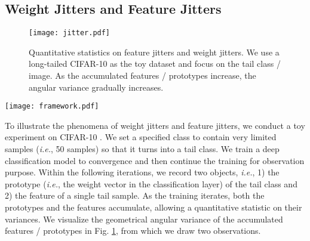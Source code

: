 \documentclass[final]{cvpr}
\def\ie{\textit{i.e.}}
\begin{document}
\subsection{Weight Jitters and Feature Jitters}\label{sec:jitter}
\begin{figure}[t]
	\centering
	\texttt{[image: jitter.pdf]} 
\caption{Quantitative statistics on feature jitters and weight jitters. We use a long-tailed CIFAR-10 \cite{cifar1} as the toy dataset and focus on the tail class / image. As the accumulated features / prototypes increase, the angular variance gradually increases.}
\vspace{-0.5cm}
\label{fig:div}
\end{figure}

\begin{figure*}[t]
	\centering
	\texttt{[image: framework.pdf]} 
	\caption{MBJ for deep image classification collects historical features into memory with higher concentration on tail classes. MBJ randomly samples the raw images and transforms them into a batch of features with a convolutional neural network. Given current batch features, MBJ uses a class-specific sampling strategy to collect the features from different classes. Head classes have smaller sampling probability and tail classes have larger sampling probability. These features are stored into a memory bank, \ie, feature memory. MBJ combines the feature memory and the batch features to learn the classifier. The feature memory compensates the tail classes with higher diversity. }
	\label{fig:cls}
	\vspace{-0.4cm}
\end{figure*}


To illustrate the phenomena of weight jitters and feature jitters, we conduct a toy experiment on CIFAR-10 \cite{cifar1}. We set a specified class to contain very limited samples (\ie, 50 samples) so that it turns into a tail class. We train a deep classification model to convergence and then continue the training for observation purpose. Within the following iterations, we record two objects, \ie, 1) the prototype (\ie, the weight vector in the classification layer) of the tail class and 2) the feature of a single tail sample. As the training iterates, both the prototypes and the features accumulate, allowing a quantitative statistic on their variances. We visualize the geometrical angular variance of the accumulated features / prototypes in Fig. \ref{fig:div}, from which we draw two observations. 
\end{document}
